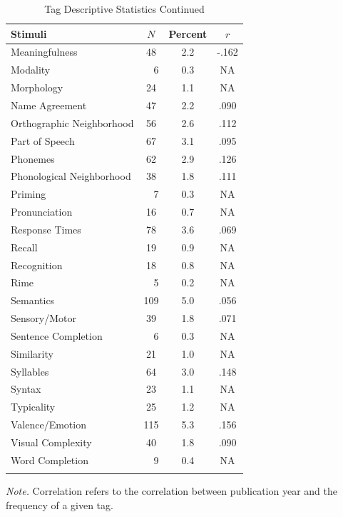 \documentclass[english,,man]{apa6}
\theoremstyle{definition}
\theoremstyle{definition}
\theoremstyle{definition}
\theoremstyle{remark}
\begin{document}
\begin{table}[tbp]
\begin{center}
\begin{threeparttable}
\caption{\label{tab:tag-table2}Tag Descriptive Statistics Continued}
\small{
\begin{tabular}{lccc}
\toprule
Stimuli & $N$ & Percent & $r$\\
\midrule
Meaningfulness & 48 & 2.2 & -.162\\
Modality & \ \ 6 & 0.3 & NA\\
Morphology & 24 & 1.1 & NA\\
Name Agreement & 47 & 2.2 & .090\\
Orthographic Neighborhood & 56 & 2.6 & .112\\
Part of Speech & 67 & 3.1 & .095\\
Phonemes & 62 & 2.9 & .126\\
Phonological Neighborhood & 38 & 1.8 & .111\\
Priming & \ \ 7 & 0.3 & NA\\
Pronunciation & 16 & 0.7 & NA\\
Response Times & 78 & 3.6 & .069\\
Recall & 19 & 0.9 & NA\\
Recognition & 18 & 0.8 & NA\\
Rime & \ \ 5 & 0.2 & NA\\
Semantics & 109 & 5.0 & .056\\
Sensory/Motor & 39 & 1.8 & .071\\
Sentence Completion & \ \ 6 & 0.3 & NA\\
Similarity & 21 & 1.0 & NA\\
Syllables & 64 & 3.0 & .148\\
Syntax & 23 & 1.1 & NA\\
Typicality & 25 & 1.2 & NA\\
Valence/Emotion & 115 & 5.3 & .156\\
Visual Complexity & 40 & 1.8 & .090\\
Word Completion & \ \ 9 & 0.4 & NA\\
\bottomrule
\addlinespace
\end{tabular}
}
\begin{tablenotes}[para]
\normalsize{\textit{Note.} Correlation refers to the correlation between publication year and the frequency of a given tag.}
\end{tablenotes}
\end{threeparttable}
\end{center}
\end{table}
\end{document}
